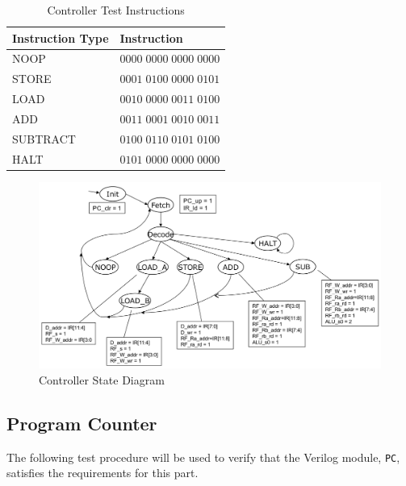 \begin{table}
    \centering
    \begin{tabular}{ll}                                                 \toprule
        \textbf{Instruction Type}   & \textbf{Instruction}              \\\midrule
        NOOP                        & $0000 \; 0000 \; 0000 \; 0000$    \\
        STORE                       & $0001 \; 0100 \; 0000 \; 0101$    \\
        LOAD                        & $0010 \; 0000 \; 0011 \; 0100$    \\
        ADD                         & $0011 \; 0001 \; 0010 \; 0011$    \\
        SUBTRACT                    & $0100 \; 0110 \; 0101 \; 0100$    \\
        HALT                        & $0101 \; 0000 \; 0000 \; 0000$    \\\bottomrule
    \end{tabular}
    \caption{Controller Test Instructions\label{tab:controller_test_instructions}}
\end{table}

\begin{figure}
    \includegraphics[width=\textwidth]{images/state_diagram.png}
    \caption{Controller State Diagram \label{fig:state_diagram}}
\end{figure}


\subsection{Program Counter} %
\label{sub:program_counter_pro}

The following test procedure will be used to verify that the Verilog module, \verb|PC|, satisfies the requirements for this part.

